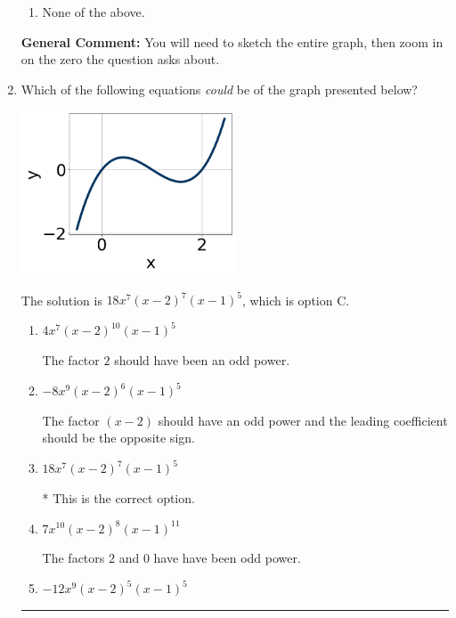 \documentclass{extbook}[14pt]
\newcommand{\litem}[1]{\item #1

\rule{\textwidth}{0.4pt}}
\begin{document}
\begin{enumerate}
{\begin{enumerate}[label=\Alph*.]
\item None of the above.\end{enumerate}
\textbf{General Comment:} You will need to sketch the entire graph, then zoom in on the zero the question asks about.
}
\litem{
Which of the following equations \textit{could} be of the graph presented below?

\begin{center}
    \includegraphics[width=0.5\textwidth]{../Figures/polyGraphToFunctionA.png}
\end{center}


The solution is \( 18x^{7} (x - 2)^{7} (x - 1)^{5} \), which is option C.\begin{enumerate}[label=\Alph*.]
\item \( 4x^{7} (x - 2)^{10} (x - 1)^{5} \)

The factor $2$ should have been an odd power.
\item \( -8x^{9} (x - 2)^{6} (x - 1)^{5} \)

The factor $(x - 2)$ should have an odd power and the leading coefficient should be the opposite sign.
\item \( 18x^{7} (x - 2)^{7} (x - 1)^{5} \)

* This is the correct option.
\item \( 7x^{10} (x - 2)^{8} (x - 1)^{11} \)

The factors $2$ and $0$ have have been odd power.
\item \( -12x^{9} (x - 2)^{5} (x - 1)^{5} \)


\end{enumerate}}
\end{enumerate}
\end{document}
